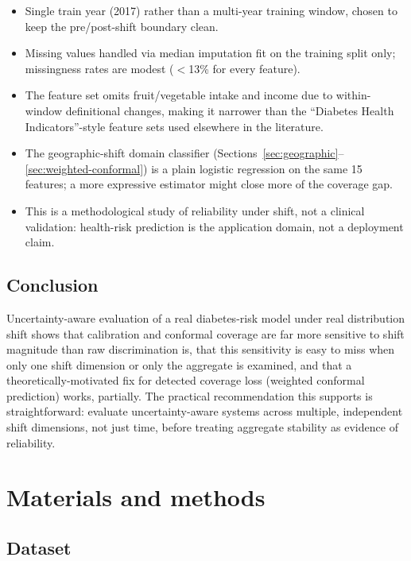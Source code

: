 \documentclass[12pt]{article}
\begin{document}
\begin{itemize}[leftmargin=*]
\item Single train year (2017) rather than a multi-year training window, chosen to keep the pre/post-shift boundary clean.
\item Missing values handled via median imputation fit on the training split only; missingness rates are modest ($<$13\% for every feature).
\item The feature set omits fruit/vegetable intake and income due to within-window definitional changes, making it narrower than the ``Diabetes Health Indicators''-style feature sets used elsewhere in the literature.
\item The geographic-shift domain classifier (Sections~\ref{sec:geographic}--\ref{sec:weighted-conformal}) is a plain logistic regression on the same 15 features; a more expressive estimator might close more of the coverage gap.
\item This is a methodological study of reliability under shift, not a clinical validation: health-risk prediction is the application domain, not a deployment claim.
\end{itemize}

\subsection{Conclusion}

Uncertainty-aware evaluation of a real diabetes-risk model under real distribution shift shows that calibration and conformal coverage are far more sensitive to shift magnitude than raw discrimination is, that this sensitivity is easy to miss when only one shift dimension or only the aggregate is examined, and that a theoretically-motivated fix for detected coverage loss (weighted conformal prediction) works, partially. The practical recommendation this supports is straightforward: evaluate uncertainty-aware systems across multiple, independent shift dimensions, not just time, before treating aggregate stability as evidence of reliability.

\section{Materials and methods}

\subsection{Dataset}
\end{document}
